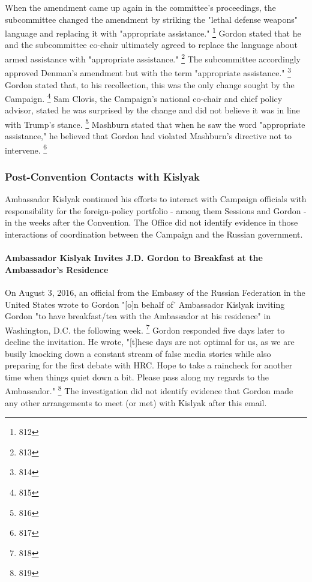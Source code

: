 When the amendment came up again in the committee's proceedings, the subcommittee changed the amendment by striking the "lethal defense weapons" language and replacing it with "appropriate assistance."%
\footnote{812}
Gordon stated that he and the subcommittee co-chair ultimately agreed to replace the language about armed assistance with "appropriate assistance."%
\footnote{813}
The subcommittee accordingly approved Denman's amendment but with the term "appropriate assistance."%
\footnote{814}
Gordon stated that, to his recollection, this was the only change sought by the Campaign.%
\footnote{815}
Sam Clovis, the Campaign's national co-chair and chief policy advisor, stated he was surprised by the change and did not believe it was in line with Trump's stance.%
\footnote{816}
Mashburn stated that when he saw the word "appropriate assistance," he believed that Gordon had violated Mashburn's directive not to intervene.%
\footnote{817}

\subsubsection{Post-Convention Contacts with Kislyak}

Ambassador Kislyak continued his efforts to interact with Campaign officials with responsibility for the foreign-policy portfolio - among them Sessions and Gordon - in the weeks after the Convention.
The Office did not identify evidence in those interactions of coordination between the Campaign and the Russian government.

\paragraph{Ambassador Kislyak Invites J.D. Gordon to Breakfast at the Ambassador's Residence}

On August 3, 2016, an official from the Embassy of the Russian Federation in the United States wrote to Gordon "[o]n behalf of' Ambassador Kislyak inviting Gordon "to have breakfast/tea with the Ambassador at his residence" in Washington, D.C. the following week.%
\footnote{818}
Gordon responded five days later to decline the invitation.
He wrote, "[t]hese days are not optimal for us, as we are busily knocking down a constant stream of false media stories while also preparing for the first debate with HRC.
Hope to take a raincheck for another time when things quiet down a bit.
Please pass along my regards to the Ambassador."%
\footnote{819}
The investigation did not identify evidence that Gordon made any other arrangements to meet (or met) with Kislyak after this email.

